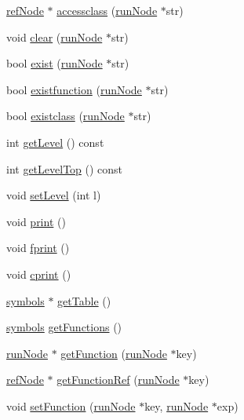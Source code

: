 \begin{DoxyCompactItemize}
\item 
\hyperlink{classrefNode}{ref\-Node} $\ast$ \hyperlink{classsTable_a957f301c4be9bef777ba9cda087f5b21}{accessclass} (\hyperlink{classrunNode}{run\-Node} $\ast$str)
\item 
void \hyperlink{classsTable_a2fc47d83ff9f0f97ded0902e18189d20}{clear} (\hyperlink{classrunNode}{run\-Node} $\ast$str)
\item 
bool \hyperlink{classsTable_aa000ee3b3d80be90d345dacd8ce406ad}{exist} (\hyperlink{classrunNode}{run\-Node} $\ast$str)
\item 
bool \hyperlink{classsTable_a1b4595dd00dc0044b400d097614776d0}{existfunction} (\hyperlink{classrunNode}{run\-Node} $\ast$str)
\item 
bool \hyperlink{classsTable_add44366e5b9bb92807dbcb1a101d41e4}{existclass} (\hyperlink{classrunNode}{run\-Node} $\ast$str)
\item 
int \hyperlink{classsTable_a1a0f2aef31fd214a7f38b05842684462}{get\-Level} () const 
\item 
int \hyperlink{classsTable_a71d0d14cf7c982b67c875f0b33ccddc9}{get\-Level\-Top} () const 
\item 
void \hyperlink{classsTable_a257736173d31de237fdb226e85cb561d}{set\-Level} (int l)
\item 
void \hyperlink{classsTable_ae5edea4fbd5a5046fe39d849b81ab0a7}{print} ()
\item 
void \hyperlink{classsTable_aa73eab281df7f3bb53a22f3e28d6a6a9}{fprint} ()
\item 
void \hyperlink{classsTable_a63a951aec8df80400dc60aa7ab241442}{cprint} ()
\item 
\hyperlink{classsymbolsTable}{symbols} $\ast$ \hyperlink{classsTable_ab97a20a919412e2c0e2e031fe1262233}{get\-Table} ()
\item 
\hyperlink{classsymbolsTable}{symbols} \hyperlink{classsTable_a9a9a56a7e8fc4a6fcabf4366ad8e3d22}{get\-Functions} ()
\item 
\hyperlink{classrunNode}{run\-Node} $\ast$ \hyperlink{classsTable_a3db1d8ca136cb466440f7c356863d7fc}{get\-Function} (\hyperlink{classrunNode}{run\-Node} $\ast$key)
\item 
\hyperlink{classrefNode}{ref\-Node} $\ast$ \hyperlink{classsTable_a0565e905480646205354beddf3f2e664}{get\-Function\-Ref} (\hyperlink{classrunNode}{run\-Node} $\ast$key)
\item 
void \hyperlink{classsTable_a4743ef61fd3a1f986587697805cb9f1e}{set\-Function} (\hyperlink{classrunNode}{run\-Node} $\ast$key, \hyperlink{classrunNode}{run\-Node} $\ast$exp)

\end{DoxyCompactItemize}
